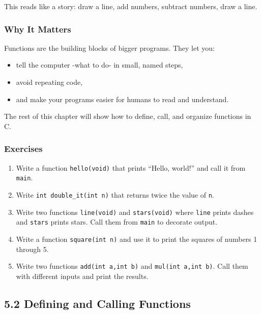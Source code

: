 \documentclass[
  letterpaper,
  DIV=11,
  numbers=noendperiod]{scrreprt}
\providecommand{\tightlist}{%
  \setlength{\itemsep}{0pt}\setlength{\parskip}{0pt}}
\begin{document}
This reads like a story: draw a line, add numbers, subtract numbers,
draw a line.

\subsubsection{Why It Matters}\label{why-it-matters-19}

Functions are the building blocks of bigger programs. They let you:

\begin{itemize}
\tightlist
\item
  tell the computer -what to do- in small, named steps,
\item
  avoid repeating code,
\item
  and make your programs easier for humans to read and understand.
\end{itemize}

The rest of this chapter will show how to define, call, and organize
functions in C.

\subsubsection{Exercises}\label{exercises-20}

\begin{enumerate}
\def\labelenumi{\arabic{enumi}.}
\tightlist
\item
  Write a function \texttt{hello(void)} that prints ``Hello, world!''
  and call it from \texttt{main}.
\item
  Write \texttt{int\ double\_it(int\ n)} that returns twice the value of
  \texttt{n}.
\item
  Write two functions \texttt{line(void)} and \texttt{stars(void)} where
  \texttt{line} prints dashes and \texttt{stars} prints stars. Call them
  from \texttt{main} to decorate output.
\item
  Write a function \texttt{square(int\ n)} and use it to print the
  squares of numbers 1 through 5.
\item
  Write two functions \texttt{add(int\ a,int\ b)} and
  \texttt{mul(int\ a,int\ b)}. Call them with different inputs and print
  the results.
\end{enumerate}

\subsection{5.2 Defining and Calling
Functions}\label{defining-and-calling-functions}
\end{document}
